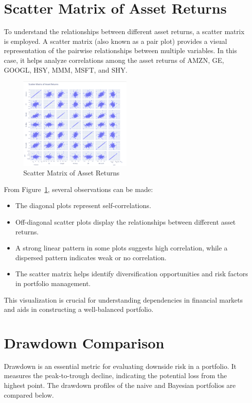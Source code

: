 \documentclass[a4paper,12pt]{article}
\begin{document}
\section{Scatter Matrix of Asset Returns}
To understand the relationships between different asset returns, a scatter matrix is employed. A scatter matrix (also known as a pair plot) provides a visual representation of the pairwise relationships between multiple variables. In this case, it helps analyze correlations among the asset returns of AMZN, GE, GOOGL, HSY, MMM, MSFT, and SHY.

\begin{figure}[H]
    \centering
    \includegraphics[width=0.5\textwidth]{figures/Figure4.png} 
    \caption{Scatter Matrix of Asset Returns}
    \label{fig:scatter_matrix}
\end{figure}

From Figure~\ref{fig:scatter_matrix}, several observations can be made:
\begin{itemize}
    \item The diagonal plots represent self-correlations.
    \item Off-diagonal scatter plots display the relationships between different asset returns.
    \item A strong linear pattern in some plots suggests high correlation, while a dispersed pattern indicates weak or no correlation.
    \item The scatter matrix helps identify diversification opportunities and risk factors in portfolio management.
\end{itemize}

This visualization is crucial for understanding dependencies in financial markets and aids in constructing a well-balanced portfolio.

\section{Drawdown Comparison}
Drawdown is an essential metric for evaluating downside risk in a portfolio. It measures the peak-to-trough decline, indicating the potential loss from the highest point. The drawdown profiles of the naive and Bayesian portfolios are compared below.
\end{document}
